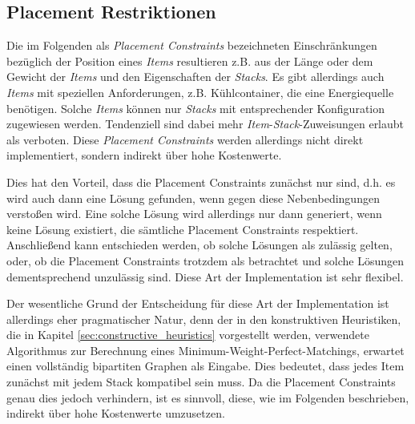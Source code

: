 \pagebreak

\subsection{Placement Restriktionen}
\label{sec:placement_restrictions}

Die im Folgenden als \textit{Placement Constraints} bezeichneten Einschränkungen bezüglich der Position eines \textit{Items} resultieren z.B.
aus der Länge oder dem Gewicht der \textit{Items} und den Eigenschaften der \textit{Stacks}. Es gibt allerdings auch \textit{Items} mit speziellen Anforderungen, z.B. Kühlcontainer, die eine Energiequelle benötigen. Solche \textit{Items} können nur \textit{Stacks} mit entsprechender Konfiguration zugewiesen werden. Tendenziell sind dabei mehr \textit{Item}-\textit{Stack}-Zuweisungen erlaubt als verboten. Diese \textit{Placement Constraints} werden allerdings nicht direkt implementiert, sondern indirekt über hohe Kostenwerte.

Dies hat den Vorteil, dass die Placement Constraints zunächst nur  sind, d.h. es wird auch
dann eine Lösung gefunden, wenn gegen diese Nebenbedingungen verstoßen wird. Eine solche Lösung wird allerdings nur dann generiert,
wenn keine Lösung existiert, die sämtliche Placement Constraints respektiert.
Anschließend kann entschieden werden, ob solche Lösungen als zulässig gelten, oder, ob die Placement Constraints trotzdem
als  betrachtet und solche Lösungen dementsprechend unzulässig sind. Diese Art der Implementation ist sehr flexibel.

Der wesentliche Grund der Entscheidung für diese Art der Implementation ist allerdings eher pragmatischer Natur, denn der in den konstruktiven Heuristiken, die in Kapitel \ref{sec:constructive_heuristics} vorgestellt werden, verwendete Algorithmus zur Berechnung eines Minimum-Weight-Perfect-Matchings, erwartet einen vollständig bipartiten Graphen als Eingabe. Dies bedeutet, dass jedes Item zunächst mit jedem Stack kompatibel sein muss. Da die Placement Constraints genau dies jedoch verhindern, ist es sinnvoll, diese, wie im Folgenden beschrieben, indirekt über hohe Kostenwerte umzusetzen.

